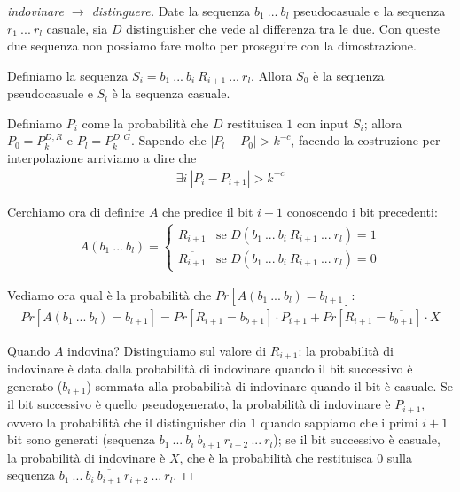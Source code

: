 \begin{proof}[indovinare $\rightarrow$ distinguere]
    Date la sequenza $b_1 \ ... \ b_{l}$ pseudocasuale e la sequenza $r_1 \ ... \ r_{l}$ casuale, sia $D$ distinguisher che vede al differenza tra le due. Con queste due sequenza non possiamo fare molto per proseguire con la dimostrazione. 
    
    Definiamo la sequenza $S_i = b_1 \ ... \ b_i \ R_{i+1} \ ... \ r_l$. Allora $S_0$ è la sequenza pseudocasuale e $S_l$ è la sequenza casuale. 

    Definiamo $P_i$ come la probabilità che $D$ restituisca $1$ con input $S_i$; allora $P_0 = P_k^{D, R}$ e $P_l = P_k^{D, G}$.
    Sapendo che $|P_l - P_0| > k^{-c}$, facendo la costruzione per interpolazione arriviamo a dire che
    \begin{align*}
        \exists i \ |P_i - P_{i+1}| > k^{-c}
    \end{align*}

    \noindent Cerchiamo ora di definire $A$ che predice il bit $i+1$ conoscendo i bit precedenti:
    \begin{align*}
        A(b_1 \ ... \ b_l) = 
        \begin{cases} 
        R_{i+1} & \mbox{se } D(b_1 \ ... \ b_i \ R_{i+1} \ ... \ r_l) = 1 \\ 
        \overline{R_{i+1}} & \mbox{se } D(b_1 \ ... \ b_i \ R_{i+1} \ ... \ r_l) = 0
        \end{cases} 
    \end{align*}

    \noindent Vediamo ora qual è la probabilità che $Pr[A(b_1 \ ... \ b_{l}) = b_{l+1}]$:
    \begin{align*}
        Pr[A(b_1 \ ... \ b_{l}) = b_{l+1}] = Pr[R_{i+1} = b_{b+1}] \cdot P_{i+1} +  Pr[R_{i+1} = \overline{b_{b+1}}] \cdot X
    \end{align*}

    \noindent Quando $A$ indovina? Distinguiamo sul valore di $R_{i+1}$: la probabilità di indovinare è data dalla probabilità di indovinare quando il bit successivo è generato ($b_{i+1}$) sommata alla probabilità di indovinare quando il bit è casuale.
    Se il bit successivo è quello pseudogenerato, la probabilità di indovinare è $P_{i+1}$, ovvero la probabilità che il distinguisher dia $1$ quando sappiamo che i primi $i+1$ bit sono generati (sequenza $b_1 \ ... \ b_i \ b_{i+1} \ r_{i+2} \ ... \ r_l$); se il bit successivo è casuale, la probabilità di indovinare è $X$, che è la probabilità che restituisca $0$ sulla sequenza $b_1 \ ... \ b_i \ \overline{b_{i+1}} \ r_{i+2} \ ... \ r_l$.


\end{proof}
